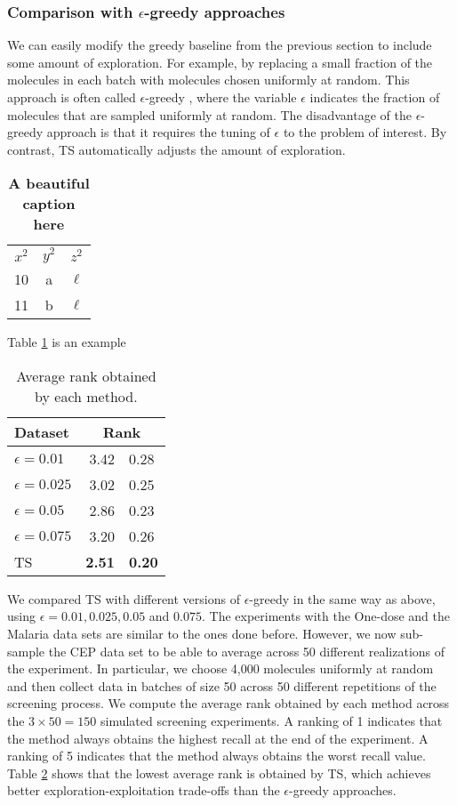 \subsubsection{Comparison with $\epsilon$-greedy approaches}

We can easily modify the greedy baseline from the previous section to include some amount of exploration. For example, by replacing a small fraction of the molecules in each batch with molecules chosen uniformly at random. This approach is often called $\epsilon$-greedy \cite{watkins1989learning}, where the variable $\epsilon$ indicates the fraction of molecules that are sampled uniformly at random. The disadvantage of the $\epsilon$-greedy approach is that it requires the tuning of $\epsilon$ to the problem of interest. By contrast, TS 
automatically adjusts the amount of exploration. 

\begin{table}
\begin{tabular}{ c c c }
 $x^2$ & $y^2$ & $z^2$ \\
 10 & a & $\ell$ \\
 11 & b & $\ell$ \\
\end{tabular}
\caption{\textbf{A beautiful caption here}}\label{table_label}
\end{table}

Table \ref{table_label} is an example

\begin{table}
\label{tab:table1}
\begin{tabular}{lr@{$\pm$}l}
\hline
\bf{Dataset}& \multicolumn{2}{c}{\bf{Rank}}\\
\hline
$\epsilon = 0.01$ & 3.42 & 0.28 \\
$\epsilon = 0.025$ & 3.02 & 0.25 \\
$\epsilon = 0.05$ & 2.86 & 0.23 \\
$\epsilon = 0.075$ & 3.20 & 0.26 \\
TS & \bf{2.51} & \bf{0.20} \\
\hline
\end{tabular}
\caption{Average rank obtained by each method.}
\end{table}

We compared TS with different versions of $\epsilon$-greedy in the same way as above, using $\epsilon = 0.01, 0.025, 0.05$ and $0.075$. The experiments with the One-dose and the Malaria data sets are similar to the ones done before. However, we now sub-sample the CEP data set to be able to average across 50 different realizations of the experiment. In particular, we choose 4,000 molecules uniformly at random and then collect data in batches of size 50 across 50 different repetitions of the screening process. We compute the average rank obtained by each method across the $3\times 50 = 150$ simulated screening experiments. A ranking of 1 indicates that the method always obtains the highest recall at the end of the experiment. A ranking of 5 indicates that the method always obtains the worst recall value. Table \ref{tab:table1} shows that the lowest average rank is obtained by TS, which achieves better exploration-exploitation trade-offs than the $\epsilon$-greedy approaches.
